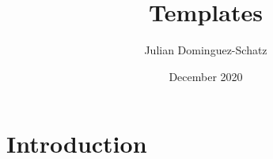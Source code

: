 \documentclass{article}
\title{Templates}
\author{Julian Dominguez-Schatz}
\date{December 2020}
\begin{document}
\maketitle

\section{Introduction}
\end{document}
